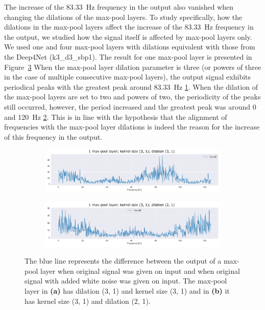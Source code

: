 The increase of the 83.33~Hz frequency in the output also vanished when changing the dilations of the max-pool layers.
To study specifically, how the dilations in the max-pool layers affect the increase of the 83.33~Hz frequency in the output, we studied how the signal itself is affected by max-pool layers only.
We used one and four max-pool layers with dilations equivalent with those from the Deep4Net (k3\_d3\_sbp1).
The result for one max-pool layer is presented in Figure~\ref{fig:max-pool-changes}
When the max-pool layer dilation parameter is three (or powers of three in the case of multiple consecutive max-pool layers), the output signal exhibits periodical peaks with the greatest peak around 83.33~Hz \ref{fig:maxpool-k3-d3}.
When the dilation of the max-pool layers are set to two and powers of two, the periodicity of the peaks still occurred, however, the period increased and the greatest peak was around 0 and 120~Hz \ref{fig:maxpool-k3-d2}.
This is in line with the hypothesis that the alignment of frequencies with the max-pool layer dilations is indeed the reason for the increase of this frequency in the output. \\


\begin{figure}
\centering
\begin{subfigure}[b]{\textwidth}
   \includegraphics[width=1\linewidth]{img/ch4/absVel-maxpool-k3-d3}
   \caption{}
   \label{fig:maxpool-k3-d3} 
\end{subfigure}

\begin{subfigure}[b]{\textwidth}
   \includegraphics[width=1\linewidth]{img/ch4/absVel-maxpool-k3-d2}
   \caption{}
   \label{fig:maxpool-k3-d2}
\end{subfigure}

\caption[]{The blue line represents the difference between the output of a max-pool layer when original signal was given on input and when original signal with added white noise was given on input. The max-pool layer in \textbf{(a)} has dilation (3, 1) and kernel size (3, 1) and in \textbf{(b)} it has kernel size (3, 1) and dilation (2, 1).} 
\label{fig:max-pool-changes}
\end{figure}

